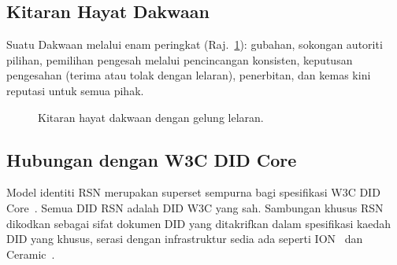 \documentclass[11pt,a4paper,twocolumn]{article}
\begin{document}
\subsection{Kitaran Hayat Dakwaan}

Suatu Dakwaan melalui enam peringkat (Raj.~\ref{fig:lifecycle}): gubahan, sokongan autoriti pilihan, pemilihan pengesah melalui pencincangan konsisten, keputusan pengesahan (terima atau tolak dengan lelaran), penerbitan, dan kemas kini reputasi untuk semua pihak.

\begin{figure}[ht]
\centering
{}
\caption{Kitaran hayat dakwaan dengan gelung lelaran.}
\label{fig:lifecycle}
\end{figure}

\subsection{Hubungan dengan W3C DID Core}

Model identiti RSN merupakan superset sempurna bagi spesifikasi W3C DID Core~\cite{did2022}. Semua DID RSN adalah DID W3C yang sah. Sambungan khusus RSN dikodkan sebagai sifat dokumen DID yang ditakrifkan dalam spesifikasi kaedah DID yang khusus, serasi dengan infrastruktur sedia ada seperti ION~\cite{buchner2021} dan Ceramic~\cite{ceramic2023}.

\end{document}
